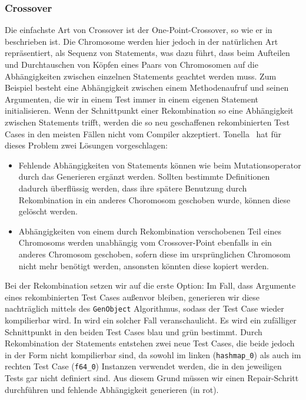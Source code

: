 \documentclass{article}
\begin{document}
\subsubsection{Crossover}
Die einfachste Art von Crossover ist der One-Point-Crossover, so wie er in~ beschrieben ist. Die Chromosome werden hier jedoch in der natürlichen Art repräsentiert, als Sequenz von Statements, was dazu führt, dass beim Aufteilen und Durchtauschen von Köpfen eines Paars von Chromosomen auf die Abhängigkeiten zwischen einzelnen Statements geachtet werden muss. Zum Beispiel besteht eine Abhängigkeit zwischen einem Methodenaufruf und seinen Argumenten, die wir in einem Test immer in einem eigenen Statement initialisieren. Wenn der Schnittpunkt einer Rekombination so eine Abhängigkeit zwischen Statements trifft, werden die so neu geschaffenen rekombinierten Test Cases in den meisten Fällen nicht vom Compiler akzeptiert. Tonella~\cite{Tonella2004} hat für dieses Problem zwei Lösungen vorgeschlagen:

\begin{itemize}
    \item Fehlende Abhängigkeiten von Statements können wie beim Mutationsoperator durch das Generieren ergänzt werden. Sollten bestimmte Definitionen dadurch überflüssig werden, dass ihre spätere Benutzung durch Rekombination in ein anderes Choromosom geschoben wurde, können diese gelöscht werden.
    \item Abhängigkeiten von einem durch Rekombination verschobenen Teil eines Chromosoms werden unabhängig vom Crossover-Point ebenfalls in ein anderes Chromosom geschoben, sofern diese im ursprünglichen Chromosom nicht mehr benötigt werden, ansonsten könnten diese kopiert werden.
\end{itemize}

Bei der Rekombination setzen wir auf die erste Option: Im Fall, dass Argumente eines rekombinierten Test Cases außenvor bleiben, generieren wir diese nachträglich mittels des \lstinline{GenObject} Algorithmus, sodass der Test Case wieder kompilierbar wird. In  wird ein solcher Fall veranschaulicht. Es wird ein zufälliger Schnittpunkt in den beiden Test Cases blau und grün bestimmt. Durch Rekombination der Statements entstehen zwei neue Test Cases, die beide jedoch in der Form nicht kompilierbar sind, da sowohl im linken (\lstinline{hashmap_0}) als auch im rechten Test Case (\lstinline{f64_0}) Instanzen verwendet werden, die in den jeweiligen Tests gar nicht definiert sind. Aus diesem Grund müssen wir einen Repair-Schritt durchführen und fehlende Abhängigkeit generieren (in rot).
\end{document}

